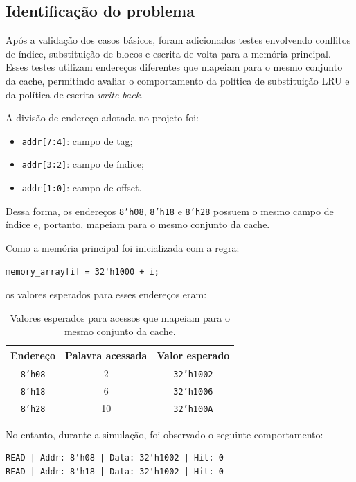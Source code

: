 ﻿\documentclass[12pt,a4paper]{article}
\begin{document}
\subsection{Identificação do problema}

Após a validação dos casos básicos, foram adicionados testes envolvendo conflitos de índice, substituição de blocos e escrita de volta para a memória principal. Esses testes utilizam endereços diferentes que mapeiam para o mesmo conjunto da cache, permitindo avaliar o comportamento da política de substituição LRU e da política de escrita \textit{write-back}.

A divisão de endereço adotada no projeto foi:

\begin{itemize}
    \item \texttt{addr[7:4]}: campo de tag;
    \item \texttt{addr[3:2]}: campo de índice;
    \item \texttt{addr[1:0]}: campo de offset.
\end{itemize}

Dessa forma, os endereços \texttt{8'h08}, \texttt{8'h18} e \texttt{8'h28} possuem o mesmo campo de índice e, portanto, mapeiam para o mesmo conjunto da cache.

Como a memória principal foi inicializada com a regra:

\begin{verbatim}
memory_array[i] = 32'h1000 + i;
\end{verbatim}

os valores esperados para esses endereços eram:

\begin{table}[h]
\centering
\begin{tabular}{|c|c|c|}
\hline
\textbf{Endereço} & \textbf{Palavra acessada} & \textbf{Valor esperado} \\
\hline
\texttt{8'h08} & 2  & \texttt{32'h1002} \\
\texttt{8'h18} & 6  & \texttt{32'h1006} \\
\texttt{8'h28} & 10 & \texttt{32'h100A} \\
\hline
\end{tabular}
\caption{Valores esperados para acessos que mapeiam para o mesmo conjunto da cache.}
\end{table}

No entanto, durante a simulação, foi observado o seguinte comportamento:

\begin{verbatim}
READ | Addr: 8'h08 | Data: 32'h1002 | Hit: 0
READ | Addr: 8'h18 | Data: 32'h1002 | Hit: 0
\end{verbatim}
\end{document}
